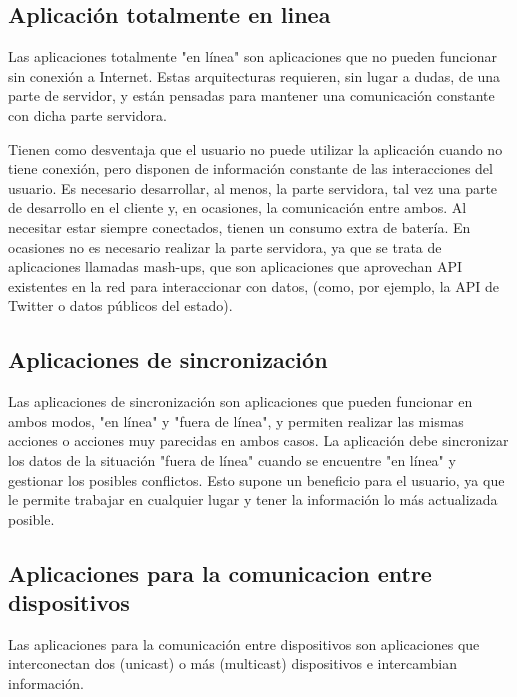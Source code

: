 \subsection{Aplicación totalmente en linea}
Las aplicaciones totalmente "en línea" son aplicaciones que no pueden funcionar sin conexión a Internet. Estas arquitecturas requieren, sin lugar a dudas, de una parte de servidor, y están pensadas para mantener una comunicación constante con dicha parte servidora.

Tienen como desventaja que el usuario no puede utilizar la aplicación cuando no tiene conexión, pero disponen de información constante de las interacciones del usuario. Es necesario desarrollar, al menos, la parte servidora, tal vez una parte de desarrollo en el cliente y, en ocasiones, la comunicación entre ambos. Al necesitar estar siempre conectados, tienen un consumo extra de batería.
En ocasiones no es necesario realizar la parte servidora, ya que se trata de aplicaciones llamadas mash-ups, que son aplicaciones que aprovechan API existentes en la red para interaccionar con datos, (como, por ejemplo, la API de Twitter o datos públicos del estado).

\subsection{Aplicaciones de sincronización}
Las aplicaciones de sincronización son aplicaciones que pueden funcionar en ambos modos, "en línea" y "fuera de línea", y permiten realizar las mismas acciones o acciones muy parecidas en ambos casos. La aplicación debe sincronizar los datos de la situación "fuera de línea" cuando se encuentre "en línea" y gestionar los posibles conflictos. Esto supone un beneficio para el usuario, ya que le permite trabajar en cualquier lugar y tener la información lo más actualizada posible.

\subsection{Aplicaciones para la comunicacion entre dispositivos}
Las aplicaciones para la comunicación entre dispositivos son aplicaciones que interconectan dos (unicast) o más (multicast) dispositivos e intercambian información.